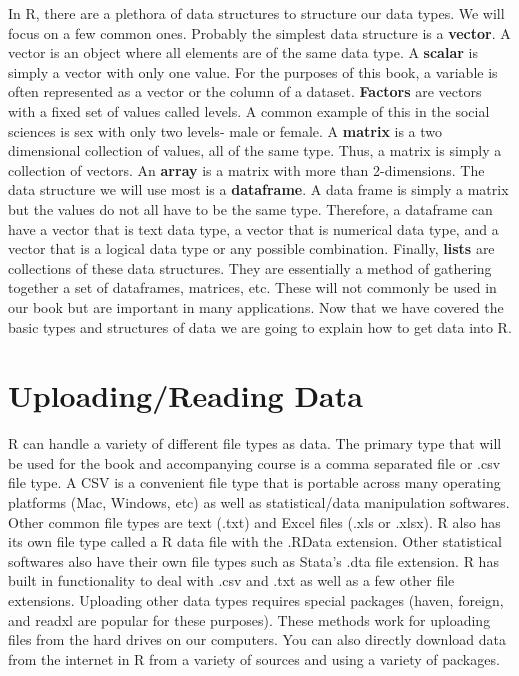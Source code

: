 \documentclass[11pt,openany]{book}\usepackage[]{graphicx}\usepackage[]{color}
\begin{document}
In R, there are  a plethora of data structures to structure our data types. We will focus on a few common ones. Probably the simplest data structure is a \textbf{vector}. A vector is an object where all elements are of the same data type. A \textbf{scalar} is simply a vector with only one value. For the purposes of this book, a variable is often represented as a vector or the column of a dataset. \textbf{Factors} are vectors with a fixed set of values called levels. A common example of this in the social sciences is sex with only two levels- male or female. A \textbf{matrix} is a two dimensional collection of values, all of the same type. Thus, a matrix is simply a collection of vectors. An \textbf{array} is a matrix with more than 2-dimensions. The data structure we will use most is a \textbf{dataframe}. A data frame is simply a matrix but the values do not all have to be the same type. Therefore, a dataframe can have a vector that is text data type, a vector that is numerical data type, and a vector that is a logical data type or any possible combination. Finally, \textbf{lists} are collections of these data structures. They are essentially a method of gathering together a set of dataframes, matrices, etc. These will not commonly be used in our book but are important in many applications. Now that we have covered the basic types and structures of data we are going to explain how to get data into R. 

\section{Uploading/Reading Data}

R can handle a variety of different file types as data. The primary type that will be used for the book and accompanying course is a comma separated file or .csv file type. A CSV is a convenient file type that is portable across many operating platforms (Mac, Windows, etc) as well as statistical/data manipulation softwares. Other common file types are text (.txt) and Excel files (.xls or .xlsx). R also has its own file type called a R data file with the .RData extension. Other statistical softwares also have their own file types such as Stata's .dta file extension. R has built in functionality to deal with .csv and .txt as well as a few other file extensions. Uploading other data types requires special packages (haven, foreign, and readxl are popular for these purposes). These methods work for uploading files from the hard drives on our computers. You can also directly download data from the internet in R from a variety of sources and using a variety of packages. 
\end{document}
